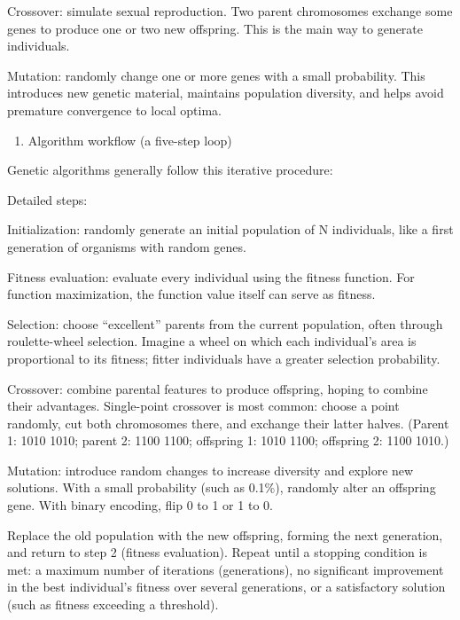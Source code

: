 Crossover: simulate sexual reproduction. Two parent chromosomes exchange some genes to produce one or two new offspring. This is the main way to generate individuals.

Mutation: randomly change one or more genes with a small probability. This introduces new genetic material, maintains population diversity, and helps avoid premature convergence to local optima.

\begin{enumerate}
\def\labelenumi{\arabic{enumi}.}
\setcounter{enumi}{1}
\tightlist
\item
  Algorithm workflow (a five-step loop)
\end{enumerate}

Genetic algorithms generally follow this iterative procedure:

Detailed steps:

Initialization: randomly generate an initial population of N individuals, like a first generation of organisms with random genes.

Fitness evaluation: evaluate every individual using the fitness function. For function maximization, the function value itself can serve as fitness.

Selection: choose ``excellent'' parents from the current population, often through roulette-wheel selection. Imagine a wheel on which each individual's area is proportional to its fitness; fitter individuals have a greater selection probability.

Crossover: combine parental features to produce offspring, hoping to combine their advantages. Single-point crossover is most common: choose a point randomly, cut both chromosomes there, and exchange their latter halves. (Parent 1: 1010 \textbar{} 1010; parent 2: 1100 \textbar{} 1100; offspring 1: 1010 1100; offspring 2: 1100 1010.)

Mutation: introduce random changes to increase diversity and explore new solutions. With a small probability (such as 0.1\%), randomly alter an offspring gene. With binary encoding, flip 0 to 1 or 1 to 0.

Replace the old population with the new offspring, forming the next generation, and return to step 2 (fitness evaluation). Repeat until a stopping condition is met: a maximum number of iterations (generations), no significant improvement in the best individual's fitness over several generations, or a satisfactory solution (such as fitness exceeding a threshold).

